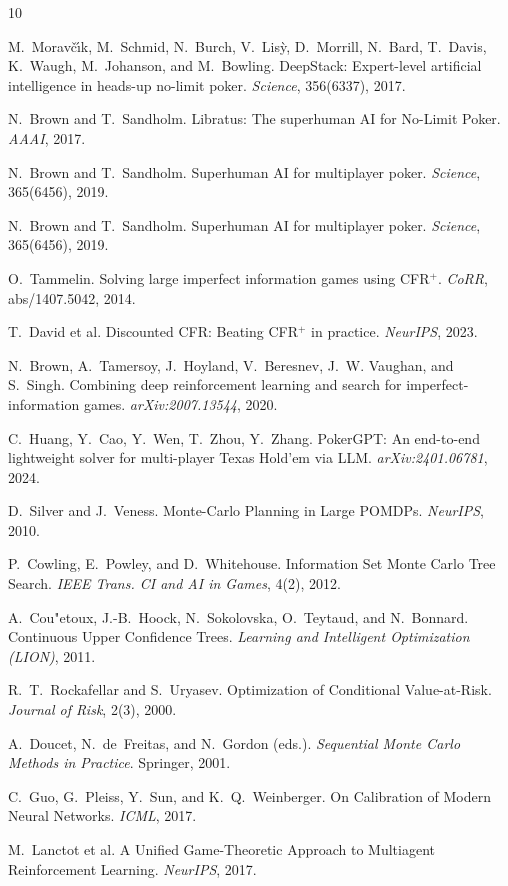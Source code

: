 \documentclass[10pt]{article}
\newcommand{\1}{\mathbf{1}}
\theoremstyle{plain}
\begin{document}
\small

\begin{thebibliography}{10}

M.~Morav\v{c}\'{\i}k, M.~Schmid, N.~Burch, V.~Lis\`{y}, D.~Morrill, N.~Bard, T.~Davis, K.~Waugh, M.~Johanson, and M.~Bowling.
\newblock DeepStack: Expert-level artificial intelligence in heads-up no-limit poker.
\newblock \emph{Science}, 356(6337), 2017.

N.~Brown and T.~Sandholm.
\newblock Libratus: The superhuman AI for No-Limit Poker.
\newblock \emph{AAAI}, 2017.

N.~Brown and T.~Sandholm.
\newblock Superhuman AI for multiplayer poker.
\newblock \emph{Science}, 365(6456), 2019.

N.~Brown and T.~Sandholm.
\newblock Superhuman AI for multiplayer poker.
\newblock \emph{Science}, 365(6456), 2019.

O.~Tammelin.
\newblock Solving large imperfect information games using CFR$^+$.
\newblock \emph{CoRR}, abs/1407.5042, 2014.

T.~David et al.
\newblock Discounted CFR: Beating CFR$^+$ in practice.
\newblock \emph{NeurIPS}, 2023.

N.~Brown, A.~Tamersoy, J.~Hoyland, V.~Beresnev, J.~W. Vaughan, and S.~Singh.
\newblock Combining deep reinforcement learning and search for imperfect-information games.
\newblock \emph{arXiv:2007.13544}, 2020.

C.~Huang, Y.~Cao, Y.~Wen, T.~Zhou, Y.~Zhang.
\newblock PokerGPT: An end-to-end lightweight solver for multi-player Texas Hold'em via LLM.
\newblock \emph{arXiv:2401.06781}, 2024.

D.~Silver and J.~Veness.
\newblock Monte-Carlo Planning in Large POMDPs.
\newblock \emph{NeurIPS}, 2010.

P.~Cowling, E.~Powley, and D.~Whitehouse.
\newblock Information Set Monte Carlo Tree Search.
\newblock \emph{IEEE Trans. CI and AI in Games}, 4(2), 2012.

A.~Cou"{e}toux, J.-B.~Hoock, N.~Sokolovska, O.~Teytaud, and N.~Bonnard.
\newblock Continuous Upper Confidence Trees.
\newblock \emph{Learning and Intelligent Optimization (LION)}, 2011.

R.~T.~Rockafellar and S.~Uryasev.
\newblock Optimization of Conditional Value-at-Risk.
\newblock \emph{Journal of Risk}, 2(3), 2000.

A.~Doucet, N.~de~Freitas, and N.~Gordon (eds.).
\newblock \emph{Sequential Monte Carlo Methods in Practice}.
\newblock Springer, 2001.

C.~Guo, G.~Pleiss, Y.~Sun, and K.~Q.~Weinberger.
\newblock On Calibration of Modern Neural Networks.
\newblock \emph{ICML}, 2017.

M.~Lanctot et al.
\newblock A Unified Game-Theoretic Approach to Multiagent Reinforcement Learning.
\newblock \emph{NeurIPS}, 2017.
\end{thebibliography}
\end{document}
